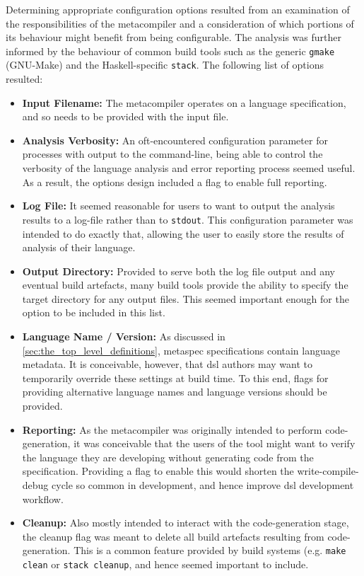 Determining appropriate configuration options resulted from an examination of the responsibilities of the metacompiler and a consideration of which portions of its behaviour might benefit from being configurable.
The analysis was further informed by the behaviour of common build tools such as the generic \texttt{gmake} (GNU-Make) and the Haskell-specific \texttt{stack}.
The following list of options resulted:
\begin{itemize}
    \item \textbf{Input Filename:} The metacompiler operates on a language specification, and so needs to be provided with the input file.
    \item \textbf{Analysis Verbosity:} An oft-encountered configuration parameter for processes with output to the command-line, being able to control the verbosity of the language analysis and error reporting process seemed useful.
    As a result, the options design included a flag to enable full reporting.
    \item \textbf{Log File:} It seemed reasonable for users to want to output the analysis results to a log-file rather than to \texttt{stdout}.
    This configuration parameter was intended to do exactly that, allowing the user to easily store the results of analysis of their language.
    \item \textbf{Output Directory:} Provided to serve both the log file output and any eventual build artefacts, many build tools provide the ability to specify the target directory for any output files.
    This seemed important enough for the option to be included in this list. 
    \item \textbf{Language Name / Version:} As discussed in \autoref{sec:the_top_level_definitions}, \gls{metaspec} specifications contain language metadata. 
    It is conceivable, however, that \gls{dsl} authors may want to temporarily override these settings at build time.
    To this end, flags for providing alternative language names and language versions should be provided. 
    \item \textbf{Reporting:} As the metacompiler was originally intended to perform code-generation, it was conceivable that the users of the tool might want to verify the language they are developing without generating code from the specification. 
    Providing a flag to enable this would shorten the write-compile-debug cycle so common in development, and hence improve \gls{dsl} development workflow.
    \item \textbf{Cleanup:} Also mostly intended to interact with the code-generation stage, the cleanup flag was meant to delete all build artefacts resulting from code-generation.
    This is a common feature provided by build systems (e.g. \texttt{make clean} or \texttt{stack cleanup}, and hence seemed important to include.
\end{itemize}

